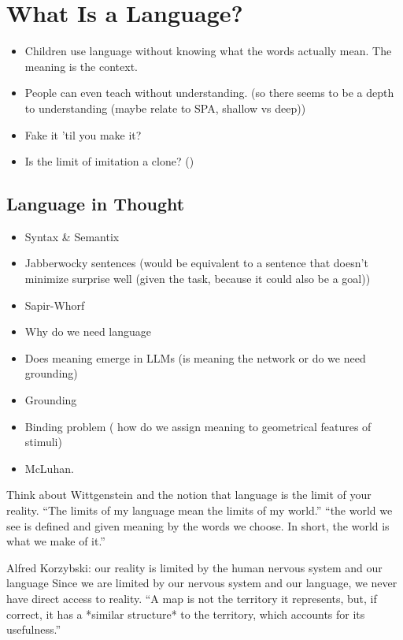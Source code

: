 \section{What Is a Language?}




\begin{itemize}
    \item Children use language without knowing what the words actually mean. The meaning is the context. 
    \item People can even teach without understanding. (so there seems to be a depth to understanding (maybe relate to SPA, shallow vs deep))
    \item Fake it 'til you make it?
    \item Is the limit of imitation a clone? ()
\end{itemize}






\subsection{Language in Thought}
\begin{itemize}
    \item Syntax \& Semantix
    \item Jabberwocky sentences (would be equivalent to a sentence that doesn't minimize surprise well (given the task, because it could also be a goal))
\end{itemize}

\begin{itemize}
    \item Sapir-Whorf
    \item Why do we need language
    \item Does meaning emerge in LLMs (is meaning the network or do we need grounding)
    \item Grounding
    \item Binding problem ( how do we assign meaning to geometrical features of stimuli)
    \item McLuhan.
\end{itemize}


Think about Wittgenstein and the notion that language is the limit of your reality.   
“The limits of my language mean the limits of my world.”  
“the world we see is defined and given meaning by the words we choose. In short, the world is what we make of it.”

Alfred Korzybski:
our reality is limited by the human nervous system and our language
Since we are limited by our nervous system and our language, we never have direct access to reality.
“A map is not the territory it represents, but, if correct, it has a *similar structure* to the territory, which accounts for its usefulness.”


